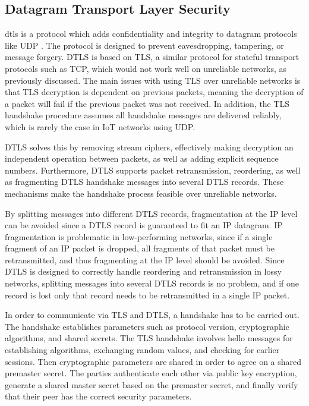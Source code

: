 \documentclass[0-thesis.tex]{subfiles}
\begin{document}
\subsection{Datagram Transport Layer Security}
\label{ssec:dtls}
\acrfull{dtls} is a protocol which adds confidentiality and integrity to datagram
protocols like UDP \parencite{rfc6347}. The protocol is designed to prevent eavesdropping,
tampering, or message forgery. DTLS is based on TLS, a similar protocol for stateful
transport protocols such as TCP, which would not work well on unreliable networks, as
previously discussed. The main issues with using TLS over unreliable networks is that TLS
decryption is dependent on previous packets, meaning the decryption of a packet will fail
if the previous packet was not received. In addition, the TLS handshake procedure assumes
all handshake messages are delivered reliably, which is rarely the case in IoT networks
using UDP.

DTLS solves this by removing stream ciphers, effectively making decryption an independent
operation between packets, as well as adding explicit sequence numbers. Furthermore, DTLS
supports packet retransmission, reordering, as well as fragmenting DTLS handshake messages
into several DTLS records. These mechanisms make the handshake process feasible over
unreliable networks. 

By splitting messages into different DTLS records, fragmentation at the IP level can be
avoided since a DTLS record is guaranteed to fit an IP datagram. IP fragmentation is
problematic in low-performing networks, since if a single fragment of an IP packet is
dropped, all fragments of that packet must be retransmitted, and thus fragmenting at the IP
level should be avoided. Since DTLS is designed to correctly handle reordering and
retransmission in lossy networks, splitting messages into several DTLS records is no
problem, and if one record is lost only that record needs to be retransmitted in a single
IP packet.

In order to communicate via TLS and DTLS, a handshake has to be carried out. The handshake
establishes parameters such as protocol version, cryptographic algorithms, and shared
secrets. The TLS handshake involves hello messages for establishing algorithms, exchanging
random values, and checking for earlier sessions. Then cryptographic parameters are shared
in order to agree on a shared premaster secret. The parties authenticate each other via
public key encryption, generate a shared master secret based on the premaster secret, and
finally verify that their peer has the correct security parameters.
\end{document}
